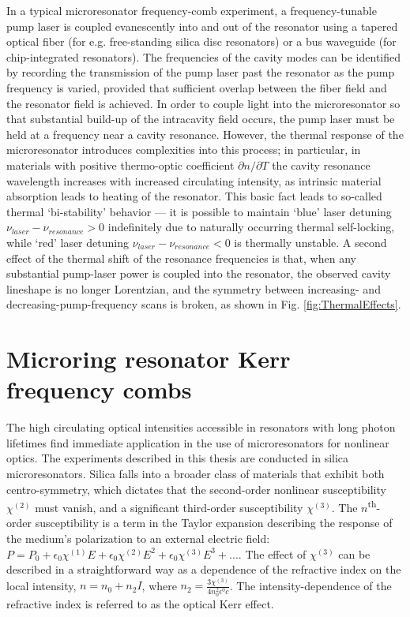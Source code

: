 In a typical microresonator frequency-comb experiment, a frequency-tunable pump laser is coupled evanescently into and out of the resonator using a tapered optical fiber (for e.g. free-standing silica disc resonators) or a bus waveguide (for chip-integrated resonators). The frequencies of the cavity modes can be identified by recording the transmission of the pump laser past the resonator as the pump frequency is varied, provided that sufficient overlap between the fiber field and the resonator field is achieved. In order to couple light into the microresonator so that substantial build-up of the intracavity field occurs, the pump laser must be held at a frequency near a cavity resonance. However, the thermal response of the microresonator introduces complexities into this process; in particular, in materials with positive thermo-optic coefficient $\partial n/ \partial T$ the cavity resonance wavelength increases with increased circulating intensity, as intrinsic material absorption leads to heating of the resonator. This basic fact leads to so-called thermal `bi-stability' behavior \cite{Carmon2004} --- it is possible to maintain `blue' laser detuning $\nu_{laser}-\nu_{resonance}>0$ indefinitely due to naturally occurring thermal self-locking, while `red' laser detuning $\nu_{laser}-\nu_{resonance}<0$ is thermally unstable. A second effect of the thermal shift of the resonance frequencies is that, when any substantial pump-laser power is coupled into the resonator, the observed cavity lineshape is no longer Lorentzian, and the symmetry between increasing- and decreasing-pump-frequency scans is broken, as shown in Fig. \ref{fig:ThermalEffects}. 







\section{Microring resonator Kerr frequency combs}

The high circulating optical intensities accessible in resonators with long photon lifetimes find immediate application in the use of microresonators for nonlinear optics. The experiments described in this thesis are conducted in silica microresonators. Silica falls into a broader class of materials that exhibit both centro-symmetry, which dictates that the second-order nonlinear susceptibility $\chi^{(2)}$ must vanish, and a significant third-order susceptibility $\chi^{(3)}$. The $n$\textsuperscript{th}-order susceptibility is a term in the Taylor expansion describing the response of the medium's polarization to an external electric field: $P=P_0+\epsilon_0 \chi^{(1)} E + \epsilon_0 \chi^{(2)} E^2 + \epsilon_0 \chi^{(3)} E^3+...$. The effect of $\chi^{(3)}$ can be described in a straightforward way as a dependence of the refractive index on the local intensity, $n=n_0+n_2 I$\cite{somethingelse}, where $n_2=\frac{3\chi^{(3)}}{4n_0^2\epsilon^0 c}$\cite{CosoAndSolis,alsoLLbook?}. The intensity-dependence of the refractive index is referred to as the optical Kerr effect.


